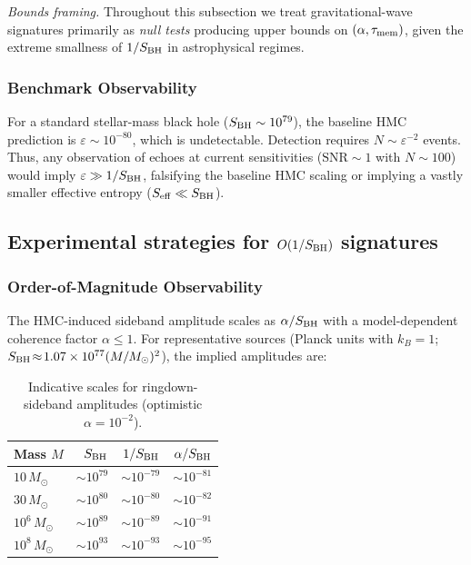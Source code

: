 \documentclass[aps,prd,preprint,onecolumn,superscriptaddress,nofootinbib,longbibliography,floatfix,11pt,showpacs,showkeys]{revtex4-2}
\newcommand{\HMC}{\textsc{HMC}\xspace}
\theoremstyle{plain}
\theoremstyle{definition}
\theoremstyle{remark}
\begin{document}
\emph{Bounds framing.} Throughout this subsection we treat gravitational-wave signatures primarily as \emph{null tests} producing upper bounds on $(\alpha,\tau_{\rm mem})$, given the extreme smallness of $1/S_{\rm BH}$ in astrophysical regimes.

\subsubsection{Benchmark Observability}
For a standard stellar-mass black hole ($S_{\rm BH} \sim 10^{79}$), the baseline HMC prediction is $\varepsilon \sim 10^{-80}$, which is undetectable.
Detection requires $N \sim \varepsilon^{-2}$ events.
Thus, any observation of echoes at current sensitivities ($\text{SNR} \sim 1$ with $N \sim 100$) would imply $\varepsilon \gg 1/S_{\rm BH}$, falsifying the baseline HMC scaling or implying a vastly smaller effective entropy ($S_{\rm eff} \ll S_{\rm BH}$).

\subsection{Experimental strategies for \texorpdfstring{$O(1/S_{\rm BH})$}{O(1/SBH)} signatures}

\label{sec:exp}

\subsubsection{Order-of-Magnitude Observability}
The \HMC{}-induced sideband amplitude scales as $\alpha/S_{\rm BH}$ with a model-dependent coherence factor $\alpha\!\le\!1$.
For representative sources (Planck units with $k_B{=}1$; $S_{\rm BH}\!\approx\!1.07\times 10^{77}(M/M_\odot)^2$), the implied amplitudes are:

\begin{table}[htbp]
\centering
\caption{Indicative scales for ringdown-sideband amplitudes (optimistic $\alpha=10^{-2}$).}
\label{tab:observability}
\small
\begin{tabular}{lrrr}
\toprule
Mass $M$ & $S_{\rm BH}$ & $1/S_{\rm BH}$ & $\alpha/S_{\rm BH}$ \\
\midrule
$10\,M_\odot$ & $\sim 10^{79}$ & $\sim 10^{-79}$ & $\sim 10^{-81}$ \\
$30\,M_\odot$ & $\sim 10^{80}$ & $\sim 10^{-80}$ & $\sim 10^{-82}$ \\
$10^6\,M_\odot$ & $\sim 10^{89}$ & $\sim 10^{-89}$ & $\sim 10^{-91}$ \\
$10^8\,M_\odot$ & $\sim 10^{93}$ & $\sim 10^{-93}$ & $\sim 10^{-95}$ \\
\bottomrule
\end{tabular}
\end{table}
\end{document}
